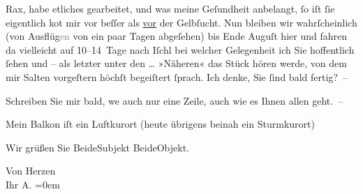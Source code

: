                Rax, habe etliches gearbeitet, und was meine
               Geſundheit anbelangt, ſo iſt ſie eigentlich ko{\geminationm}t mir vor
               beſſer als \uline{vor} der Gelbſucht. Nun bleiben wir
               wahrſcheinlich (\introOben{}von\introOben{} Ausflüg\textcolor{gray}{en} von ein
               paar Tagen abge{\pb}ſehen) bis Ende Auguſt
               hier und fahren da{\geminationn} vielleicht auf 10–14 Tage nach Iſchl bei welcher Gelegenheit ich Sie hoffentlich
               ſehen und – als letzter unter den {\dots} »Näheren« das Stück hören werde, von dem mir
                  Salten vorgeſtern höchſt begeiſtert ſprach.
               Ich denke, {\pb}Sie ſind bald fertig? –\pend
           
\pstart
           Schreiben Sie mir bald, we{\geminationn} auch nur eine Zeile, auch
               wie es Ihnen allen geht. –\pend
           
\pstart
           Mein Balkon iſt ein Luftkurort (heute übrigens beinah ein Sturmkurort)\pend
           
\pstart
           Wir grüßen Sie Beide\noindent{}Subjekt Beide\noindent{}Objekt.\pend
           
\pstart
           Von Herzen{\\[\baselineskip]}Ihr \spacefill\mbox{A.}\pend
           \leftskip=0em{}\endnumbering{}  
      